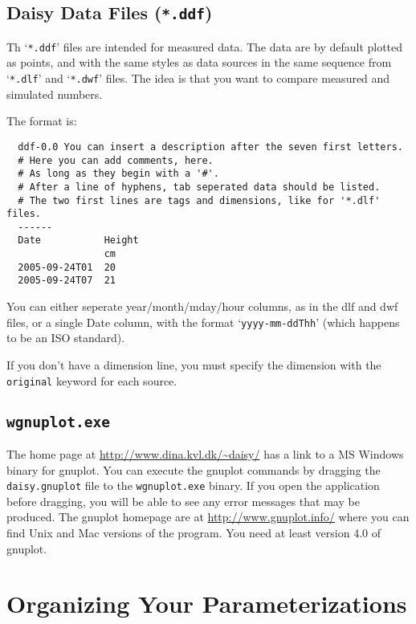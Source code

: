 \documentclass[a4paper,11pt]{article}
\begin{document}
\subsection{Daisy Data Files (\texttt{*.ddf})}

Th `\texttt{*.ddf}' files are intended for measured data.  The data
are by default plotted as points, and with the same styles as data
sources in the same sequence from `\texttt{*.dlf}' and
`\texttt{*.dwf}' files.  The idea is that you want to compare measured
and simulated numbers.

The format is:
\begin{verbatim}
  ddf-0.0 You can insert a description after the seven first letters.
  # Here you can add comments, here.
  # As long as they begin with a '#'.
  # After a line of hyphens, tab seperated data should be listed.
  # The two first lines are tags and dimensions, like for '*.dlf' files.
  ------
  Date           Height
                 cm
  2005-09-24T01  20
  2005-09-24T07  21
\end{verbatim}
You can either seperate year/month/mday/hour columns, as in the dlf
and dwf files, or a single Date column, with the format
`\texttt{yyyy-mm-ddThh}' (which happens to be an ISO standard).

If you don't have a dimension line, you must specify the dimension
with the \texttt{original} keyword for each source.

\subsection{\texttt{wgnuplot.exe}}

The \daisy{} home page at \url{http://www.dina.kvl.dk/~daisy/} has a
link to a MS Windows binary for gnuplot.  You can execute the gnuplot
commands by dragging the \texttt{daisy.gnuplot} file to the
\texttt{wgnuplot.exe} binary.  If you open the application before
dragging, you will be able to see any error messages that may be
produced. The gnuplot homepage are at \url{http://www.gnuplot.info/}
where you can find Unix and Mac versions of the program.  You need at
least version 4.0 of gnuplot.

\section{Organizing Your Parameterizations}
\label{sec:files}
\end{document}

